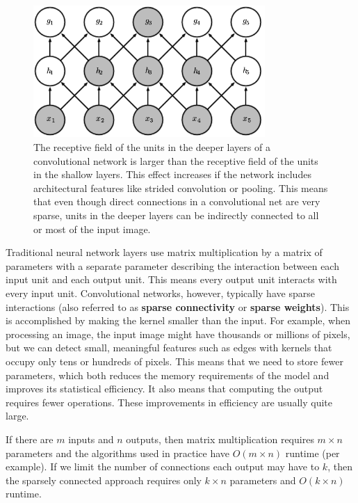 \documentclass{report}
\begin{document}
\begin{figure}[ht]
	\includegraphics[width=250pt]{30}
	\centering
	\caption{The receptive ﬁeld of the units in the deeper layers of a convolutional network is larger than the receptive ﬁeld of the units in the shallow layers. This effect increases if the network includes architectural features like strided convolution or pooling. This means that even though direct connections in a convolutional net are very sparse, units in the deeper layers can be indirectly connected to all or most of the input image.}
\end{figure}

Traditional neural network layers use matrix multiplication by a matrix of parameters with a separate parameter describing the interaction between each input unit and each output unit. This means every output unit interacts with every input unit. Convolutional networks, however, typically have sparse interactions (also referred to as \textbf{sparse connectivity} or \textbf{sparse weights}). This is accomplished by making the kernel smaller than the input. For example, when processing an image, the input image might have thousands or millions of pixels, but we can detect small, meaningful features such as edges with kernels that occupy only tens or hundreds of pixels. This means that we need to store fewer parameters, which both reduces the memory requirements of the model and improves its statistical efficiency. It also means that computing the output requires fewer operations. These improvements in efficiency are usually quite large.

If there are $m$ inputs and $n$ outputs, then matrix multiplication requires $m \times n$ parameters and the algorithms used in practice have $O(m \times n )$ runtime (per example). If we limit the number of connections each output may have to $k$, then the sparsely connected approach requires only $k \times n$ parameters and $O(k \times n)$ runtime.
\end{document}
